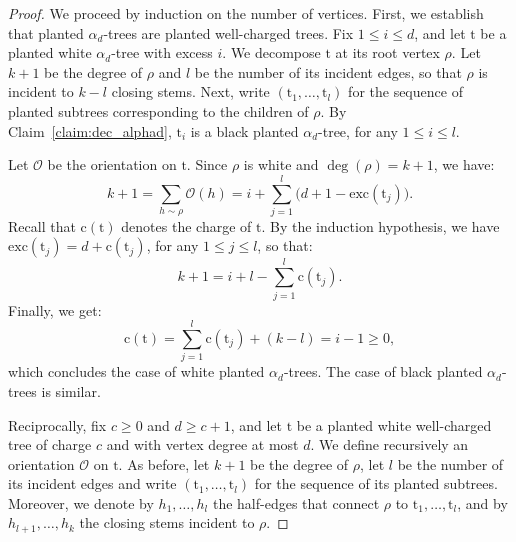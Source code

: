 \documentclass[11pt,reqno,tbtags]{amsart}
\newcommand{\rt}{\mathrm{t}}
\newcommand{\rc}{\mathrm{c}}
\numberwithin{equation}{section}
\numberwithin{theo}{section}
\theoremstyle{definition}
\newcommand{\cO}{\mathcal{O}}
\begin{document}
\begin{proof}
We proceed by induction on the number of vertices. First, we establish that planted $\alpha_d$-trees are planted well-charged trees. Fix $1\leq i\leq d$, and let $\rt$ be a planted white $\alpha_d$-tree with excess $i$. We decompose $\rt$ at its root vertex $\rho$. Let $k+1$ be the degree of $\rho$ and $l$ be the number of its incident edges, so that $\rho$ is incident to $k-l$ closing stems. Next, write $(\rt_1,\ldots,\rt_{l})$ for the sequence of planted subtrees corresponding to the children of $\rho$. By Claim~\ref{claim:dec_alphad}, $\rt_i$ is a black planted $\alpha_d$-tree, for any $1\leq i \leq l$.

Let $\cO$ be the orientation on $\rt$. Since $\rho$ is white and $\deg(\rho)=k+1$, we have: 
\begin{equation*}
k+1 = \sum_{h\sim \rho}{\cO(h)} =  i + \sum_{j=1}^l\big( d+1 - \mathrm{exc}(\rt_j)\big). 
\end{equation*} 
Recall that $\rc(\rt)$ denotes the charge of $\rt$. By the induction hypothesis, we have $\mathrm{exc}(\rt_j)=d+\rc(\rt_j)$, for any $1\leq j \leq l$, so that: 
\[
k+1 = i+l - \sum_{j=1}^l \rc(\rt_j).
\]
Finally, we get:
\begin{equation*}
\rc(\rt) = \sum_{j=1}^l \rc(\rt_j) + (k-l) = i-1\geq 0,
\end{equation*}
which concludes the case of white planted $\alpha_d$-trees. The case of black planted $\alpha_d$-trees is similar. 

\medskip

Reciprocally, fix $c\geq 0$ and $d\geq c+1$, and let $\rt$ be a planted white well-charged tree of charge $c$ and with vertex degree at most $d$. We define recursively an orientation $\cO$ on $\rt$. As before, let $k+1$ be the degree of $\rho$, let $l$ be the number of its incident edges and write $(\rt_1,\ldots,\rt_l)$ for the sequence of its planted subtrees. 
Moreover, we denote by $h_1,\ldots,h_l$ the half-edges that connect $\rho$ to $\rt_1,\ldots,\rt_l$, and by $h_{l+1},\ldots,h_k$ the closing stems incident to $\rho$. 



\end{proof}
\end{document}
